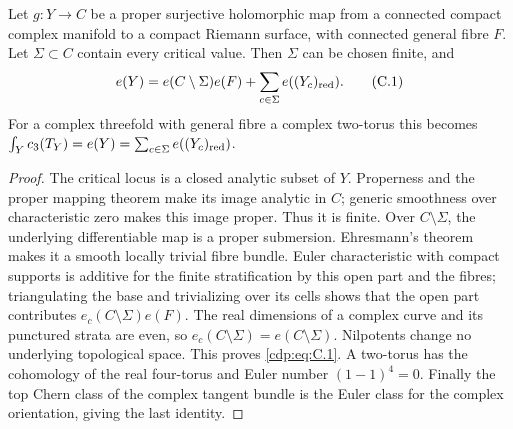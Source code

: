 
\begin{proposition}\label{cdp:st:C2a}
Let $g:Y\to C$ be a proper surjective holomorphic map from a connected compact complex manifold to a compact Riemann surface, with connected general fibre $F$. Let $\Sigma\subset C$ contain every critical value. Then $\Sigma$ can be chosen finite, and
\[
 e(Y)=e(C\setminus\Sigma)e(F)+\sum_{c\in\Sigma}e((Y_c)_{\rm red}). \tag{C.1}\label{cdp:eq:C.1}
\]
For a complex threefold with general fibre a complex two-torus this becomes
$\int_Yc_3(T_Y)=e(Y)=\sum_{c\in\Sigma}e((Y_c)_{\rm red})$.
\end{proposition}
\begin{proof}
The critical locus is a closed analytic subset of $Y$. Properness and the proper mapping theorem make its image analytic in $C$; generic smoothness over characteristic zero makes this image proper. Thus it is finite. Over $C\setminus\Sigma$, the underlying differentiable map is a proper submersion. Ehresmann's theorem makes it a smooth locally trivial fibre bundle. Euler characteristic with compact supports is additive for the finite stratification by this open part and the fibres; triangulating the base and trivializing over its cells shows that the open part contributes $e_c(C\setminus\Sigma)e(F)$. The real dimensions of a complex curve and its punctured strata are even, so $e_c(C\setminus\Sigma)=e(C\setminus\Sigma)$. Nilpotents change no underlying topological space. This proves \eqref{cdp:eq:C.1}. A two-torus has the cohomology of the real four-torus and Euler number $(1-1)^4=0$. Finally the top Chern class of the complex tangent bundle is the Euler class for the complex orientation, giving the last identity.
\end{proof}


